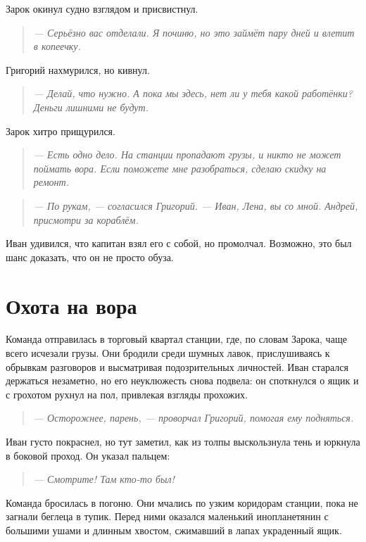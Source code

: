 \documentclass[12pt,a4paper]{book}
\newenvironment{dialogue}{\begin{quote}\itshape}{\end{quote}}
\begin{document}
Зарок окинул судно взглядом и присвистнул.

\begin{dialogue}
--- Серьёзно вас отделали. Я починю, но это займёт пару дней и влетит в копеечку.
\end{dialogue}

Григорий нахмурился, но кивнул.

\begin{dialogue}
--- Делай, что нужно. А пока мы здесь, нет ли у тебя какой работёнки? Деньги лишними не будут.
\end{dialogue}

Зарок хитро прищурился.

\begin{dialogue}
--- Есть одно дело. На станции пропадают грузы, и никто не может поймать вора. Если поможете мне разобраться, сделаю скидку на ремонт.
\end{dialogue}

\begin{dialogue}
--- По рукам, --- согласился Григорий. --- Иван, Лена, вы со мной. Андрей, присмотри за кораблём.
\end{dialogue}

Иван удивился, что капитан взял его с собой, но промолчал. Возможно, это был шанс доказать, что он не просто обуза.

\section*{Охота на вора}

Команда отправилась в торговый квартал станции, где, по словам Зарока, чаще всего исчезали грузы. Они бродили среди шумных лавок, прислушиваясь к обрывкам разговоров и высматривая подозрительных личностей. Иван старался держаться незаметно, но его неуклюжесть снова подвела: он споткнулся о ящик и с грохотом рухнул на пол, привлекая взгляды прохожих.

\begin{dialogue}
--- Осторожнее, парень, --- проворчал Григорий, помогая ему подняться.
\end{dialogue}

Иван густо покраснел, но тут заметил, как из толпы выскользнула тень и юркнула в боковой проход. Он указал пальцем:

\begin{dialogue}
--- Смотрите! Там кто-то был!
\end{dialogue}

Команда бросилась в погоню. Они мчались по узким коридорам станции, пока не загнали беглеца в тупик. Перед ними оказался маленький инопланетянин с большими ушами и длинным хвостом, сжимавший в лапах украденный ящик.
\end{document}
